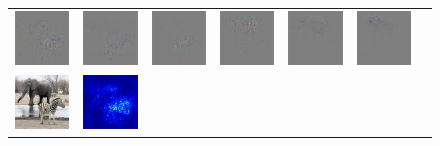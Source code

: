 \begin{figure}
\begin{center}
\begin{tabular}{ccccccc}
\includegraphics[width=0.14\linewidth,height=0.115\linewidth]{figs/examples/alexnet/soft/zeb-ele2_diff_341} &
\includegraphics[width=0.14\linewidth,height=0.115\linewidth]{figs/examples/vggnet/soft/zeb-ele2_diff_341} &
\includegraphics[width=0.14\linewidth,height=0.115\linewidth]{figs/examples/googlenet/soft/zeb-ele2_diff_341} &
\includegraphics[width=0.14\linewidth,height=0.115\linewidth]{figs/examples/alexnet/soft/zeb-ele2_diff_387} &
\includegraphics[width=0.14\linewidth,height=0.115\linewidth]{figs/examples/vggnet/soft/zeb-ele2_diff_387} &
\includegraphics[width=0.14\linewidth,height=0.115\linewidth]{figs/examples/googlenet/soft/zeb-ele2_diff_387} \\
\includegraphics[width=0.14\linewidth,height=0.115\linewidth]{figs/examples/googlenet/soft/zeb-ele2} &
\includegraphics[width=0.14\linewidth,height=0.115\linewidth]{figs/examples/alexnet/soft/zeb-ele2_sali_341} &

\end{tabular}
\end{center}
\end{figure}
